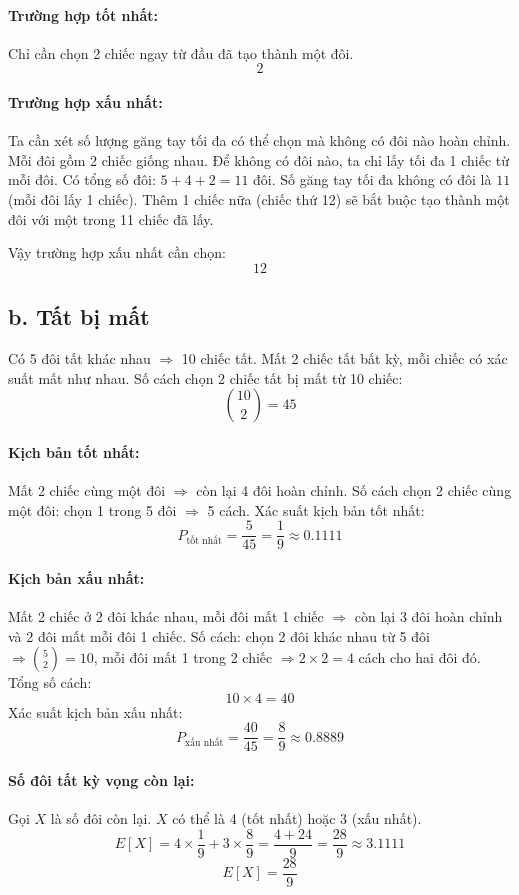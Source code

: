 \documentclass[12pt,a4paper]{article}
\begin{document}
\paragraph{Trường hợp tốt nhất:}
Chỉ cần chọn 2 chiếc ngay từ đầu đã tạo thành một đôi.
\[
\boxed{2}
\]

\paragraph{Trường hợp xấu nhất:}
Ta cần xét số lượng găng tay tối đa có thể chọn mà không có đôi nào hoàn chỉnh.  
Mỗi đôi gồm 2 chiếc giống nhau. Để không có đôi nào, ta chỉ lấy tối đa 1 chiếc từ mỗi đôi.  
Có tổng số đôi: $5+4+2 = 11$ đôi.  
Số găng tay tối đa không có đôi là $11$ (mỗi đôi lấy 1 chiếc).  
Thêm 1 chiếc nữa (chiếc thứ 12) sẽ bắt buộc tạo thành một đôi với một trong 11 chiếc đã lấy.  

Vậy trường hợp xấu nhất cần chọn:
\[
\boxed{12}
\]

\subsection*{b. Tất bị mất}
Có 5 đôi tất khác nhau $\Rightarrow$ 10 chiếc tất.  
Mất 2 chiếc tất bất kỳ, mỗi chiếc có xác suất mất như nhau.  
Số cách chọn 2 chiếc tất bị mất từ 10 chiếc:
\[
\binom{10}{2} = 45
\]

\paragraph{Kịch bản tốt nhất:} Mất 2 chiếc cùng một đôi $\Rightarrow$ còn lại 4 đôi hoàn chỉnh.  
Số cách chọn 2 chiếc cùng một đôi: chọn 1 trong 5 đôi $\Rightarrow$ 5 cách.  
Xác suất kịch bản tốt nhất:
\[
P_{\text{tốt nhất}} = \frac{5}{45} = \frac{1}{9} \approx 0.1111
\]

\paragraph{Kịch bản xấu nhất:} Mất 2 chiếc ở 2 đôi khác nhau, mỗi đôi mất 1 chiếc $\Rightarrow$ còn lại 3 đôi hoàn chỉnh và 2 đôi mất mỗi đôi 1 chiếc.  
Số cách: chọn 2 đôi khác nhau từ 5 đôi $\Rightarrow \binom{5}{2} = 10$, mỗi đôi mất 1 trong 2 chiếc $\Rightarrow 2 \times 2 = 4$ cách cho hai đôi đó.  
Tổng số cách:
\[
10 \times 4 = 40
\]
Xác suất kịch bản xấu nhất:
\[
P_{\text{xấu nhất}} = \frac{40}{45} = \frac{8}{9} \approx 0.8889
\]

\paragraph{Số đôi tất kỳ vọng còn lại:}
Gọi $X$ là số đôi còn lại.  
$X$ có thể là 4 (tốt nhất) hoặc 3 (xấu nhất).  
\[
E[X] = 4 \times \frac{1}{9} + 3 \times \frac{8}{9} = \frac{4 + 24}{9} = \frac{28}{9} \approx 3.1111
\]
\[
\boxed{E[X] = \frac{28}{9}}
\]
\end{document}
